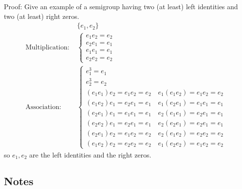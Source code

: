 Proof: Give an example of a semigroup having two (at least) left identities and two (at least) right zeros.
\begin{align*}
    & \{e_1, e_2\}    \\
    \text{Multiplication: } &
    \begin{cases}
        e_1 e_2 = e_2   \\
        e_2 e_1 = e_1   \\
        e_1 e_1 = e_1   \\
        e_2 e_2 = e_2
    \end{cases} \\
    \text{Association: } &
    \begin{cases}
        e^3_1=e_1   \\
        e^3_2=e_2   \\
        (e_1 e_1)e_2 = e_1 e_2 = e_2 \quad e_1 (e_1 e_2) = e_1 e_2 = e_2   \\
        (e_1 e_2)e_1 = e_2 e_1 = e_1 \quad e_1 (e_2 e_1) = e_1 e_1 = e_1   \\
        (e_2 e_1)e_1 = e_1 e_1 = e_1 \quad e_2 (e_1 e_1) = e_2 e_1 = e_1   \\
        (e_2 e_2)e_1 = e_2 e_1 = e_1 \quad e_2 (e_2 e_1) = e_2 e_1 = e_1   \\
        (e_2 e_1)e_2 = e_1 e_2 = e_2 \quad e_2 (e_1 e_2) = e_2 e_2 = e_2   \\
        (e_1 e_2)e_2 = e_2 e_2 = e_2 \quad e_1 (e_2 e_2) = e_1 e_2 = e_2
    \end{cases}
\end{align*}
so $e_1,e_2$ are the left identities and the right zeros.
\subsection[10]{Notes}